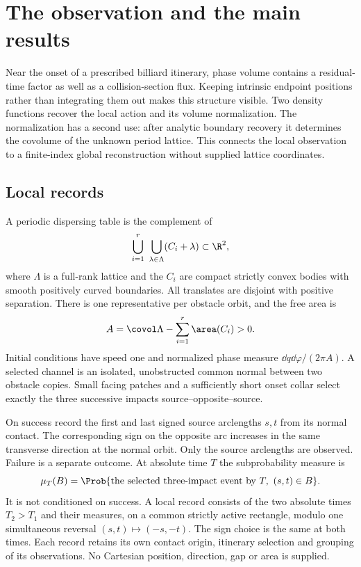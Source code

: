 \section{The observation and the main results}\label{sec:setting}
Near the onset of a prescribed billiard itinerary, phase volume contains
a residual-time factor as well as a collision-section flux. Keeping
intrinsic endpoint positions rather than integrating them out makes
this structure visible. Two density functions recover the local action
and its volume normalization. The normalization has a second use:
after analytic boundary recovery it determines the covolume of the
unknown period lattice. This connects the local observation to a
finite-index global reconstruction without supplied lattice coordinates.

\subsection{Local records}
A periodic dispersing table is the complement of
\[
             \bigcup_{i=1}^{r}\ \bigcup_{\lambda\in\Lambda}
                         (C_i+\lambda)\subset\R^2,
\]
where $\Lambda$ is a full-rank lattice and the $C_i$ are compact strictly
convex bodies with smooth positively curved boundaries. All translates
are disjoint with positive separation. There is one representative per
obstacle orbit, and the free area is
\begin{equation}\label{eq:volume}
             A=\covol\Lambda-\sum_{i=1}^r\area(C_i)>0.
\end{equation}
Initial conditions have speed one and normalized phase measure
$\dd q\dd\varphi/(2\pi A)$. A selected channel is an isolated,
unobstructed common normal between two obstacle copies. Small facing
patches and a sufficiently short onset collar select exactly the three
successive impacts source--opposite--source.

On success record the first and last signed source arclengths $s,t$
from its normal contact. The corresponding sign on the opposite arc
increases in the same transverse direction at the normal orbit.
Only the source arclengths are observed. Failure is a separate outcome.
At absolute time $T$ the subprobability measure is
\[
 \mu_T(B)=\Prob\{\text{the selected three-impact event by }T,
                                      \ (s,t)\in B\}.
\]
It is not conditioned on success. A local record consists of the two
absolute times $T_2>T_1$ and their measures, on a common strictly active
rectangle, modulo one simultaneous reversal $(s,t)\mapsto(-s,-t)$.
The sign choice is the same at both times. Each record retains its own
contact origin, itinerary selection and grouping of its observations.
No Cartesian position, direction, gap or area is supplied.

